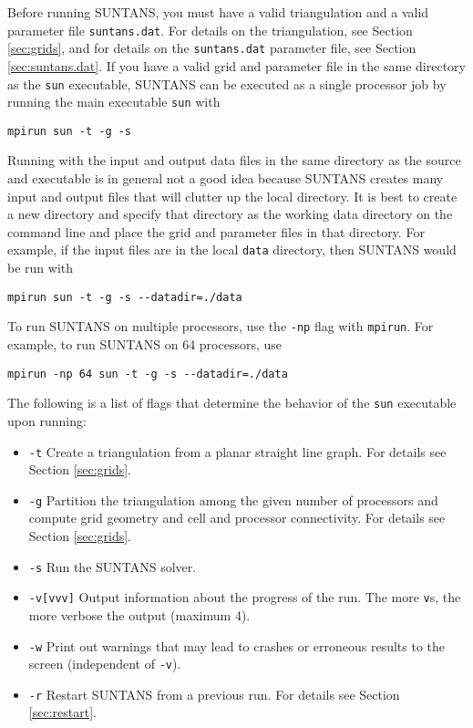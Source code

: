\documentclass[12pt,oneside]{article}
\begin{document}
Before running SUNTANS, you must have a valid triangulation and a valid parameter file \verb+suntans.dat+.
For details on the triangulation, see Section \ref{sec:grids}, and for details on the \verb+suntans.dat+
parameter file, see Section \ref{sec:suntans.dat}.  If you have a valid grid and parameter file in the same
directory as the \verb+sun+ executable, SUNTANS can be executed as a single processor job 
by running the main executable \verb+sun+ with
\begin{verbatim}
mpirun sun -t -g -s 
\end{verbatim}
Running with the input and output data files in the same directory as the source and executable
is in general not a good idea because SUNTANS creates many
input and output files that will clutter up the local directory.  It is best to create a new
directory and specify that directory as the working data directory on the command line and place the
grid and parameter files in that directory.  For
example, if the input files are in the local \verb+data+ directory, then SUNTANS would be
run with
\begin{verbatim}
mpirun sun -t -g -s --datadir=./data
\end{verbatim}
To run SUNTANS on multiple processors, use the \verb+-np+ flag with \verb+mpirun+. For example,
to run SUNTANS on 64 processors, use
\begin{verbatim}
mpirun -np 64 sun -t -g -s --datadir=./data
\end{verbatim}
The following is a list of flags that determine the behavior of the \verb+sun+ executable upon
running:
\begin{itemize}
\item{\verb+-t+} Create a triangulation from a planar straight line graph.  For details see
Section \ref{sec:grids}.
\item{\verb+-g+} Partition the triangulation among the given number of processors and
compute grid geometry and cell and processor connectivity.  For details see Section \ref{sec:grids}.
\item{\verb+-s+} Run the SUNTANS solver.
\item{\verb+-v[vvv]+} Output information about the progress of the run.  The more \verb+v+s, the
more verbose the output (maximum 4).
\item{\verb+-w+} Print out warnings that may lead to crashes or erroneous results to the screen
(independent of \verb+-v+).
\item{\verb+-r+} Restart SUNTANS from a previous run.  For details see Section \ref{sec:restart}.
\end{itemize}
\end{document}
